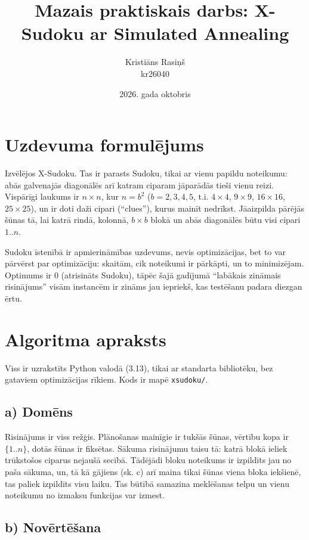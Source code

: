 \documentclass[11pt,a4paper]{article}
\title{\vspace{-1.5cm}Mazais praktiskais darbs: X-Sudoku ar Simulated Annealing}
\author{Kristiāns Rasiņš \\ kr26040}
\date{2026. gada oktobris}
\begin{document}
\maketitle
\vspace{-0.8cm}

\section{Uzdevuma formulējums}

Izvēlējos X-Sudoku. Tas ir parasts Sudoku, tikai ar vienu papildu noteikumu: abās galvenajās
diagonālēs arī katram ciparam jāparādās tieši vienu reizi. Vispārīgi laukums ir $n\times n$, kur
$n=b^2$ ($b=2,3,4,5$, t.i. $4\times4$, $9\times9$, $16\times16$, $25\times25$), un ir doti daži
cipari (``clues''), kurus mainīt nedrīkst. Jāaizpilda pārējās šūnas tā, lai katrā rindā, kolonnā,
$b\times b$ blokā un abās diagonālēs būtu visi cipari $1..n$.

Sudoku īstenībā ir apmierināmības uzdevums, nevis optimizācijas, bet to var pārvērst par
optimizāciju: skaitām, cik noteikumi ir pārkāpti, un to minimizējam. Optimums ir 0 (atrisināts
Sudoku), tāpēc šajā gadījumā ``labākais zināmais risinājums'' visām instancēm ir zināms jau iepriekš,
kas testēšanu padara diezgan ērtu.

\section{Algoritma apraksts}

Viss ir uzrakstīts Python valodā (3.13), tikai ar standarta bibliotēku, bez gataviem optimizācijas
rīkiem. Kods ir mapē \texttt{xsudoku/}.

\subsection*{a) Domēns}

Risinājums ir viss režģis. Plānošanas mainīgie ir tukšās šūnas, vērtību kopa ir $\{1..n\}$, dotās
šūnas ir fiksētas. Sākuma risinājumu taisu tā: katrā blokā ieliek trūkstošos ciparus nejaušā secībā.
Tādējādi bloku noteikums ir izpildīts jau no paša sākuma, un, tā kā gājiens (sk. c) arī maina tikai
šūnas viena bloka iekšienē, tas paliek izpildīts visu laiku. Tas būtībā samazina meklēšanas telpu un
vienu noteikumu no izmaksu funkcijas var izmest.

\subsection*{b) Novērtēšana}
\end{document}
